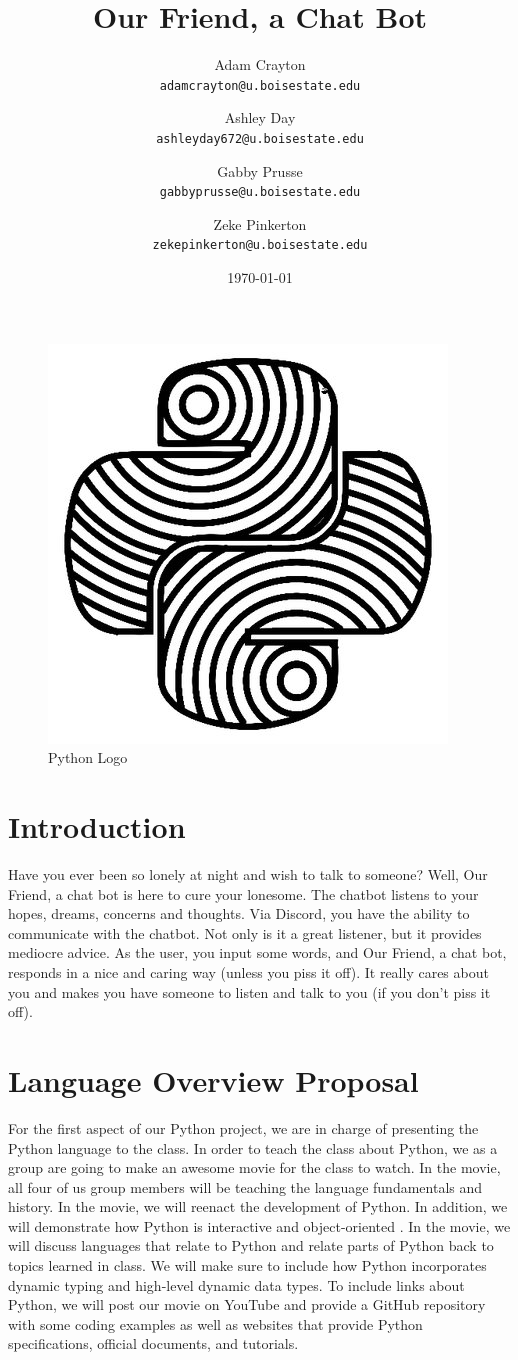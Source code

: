 \documentclass{article}
\title{Our Friend, a Chat Bot}
\author{
    Adam Crayton\\
    \texttt{adamcrayton@u.boisestate.edu}
    \and
    Ashley Day\\
    \texttt{ashleyday672@u.boisestate.edu}
    \and
    Gabby Prusse\\
    \texttt{gabbyprusse@u.boisestate.edu}
    \and
    Zeke Pinkerton\\
    \texttt{zekepinkerton@u.boisestate.edu}
}
\date{\today}
\begin{document}
\maketitle

\begin{figure}
\centering
\includegraphics[width=0.25\linewidth]{p3_latex/logo.jpg}
\caption{\label{fig:frog}Python Logo}
\end{figure}

\section{Introduction}
Have you ever been so lonely at night and wish to talk to someone? Well, Our Friend, a chat bot is here to cure your lonesome.
The chatbot listens to your hopes, dreams, concerns and thoughts.
Via Discord, you have the ability to communicate with the chatbot. Not only is it a great listener,
but it provides mediocre advice. As the user, you input some words, and Our Friend, a chat bot,
responds in a nice and caring way (unless you piss it off). It really cares about you and makes you
have someone to listen and talk to you (if you don't piss it off).

\section{Language Overview Proposal}
For the first aspect of our Python project, we are in charge of presenting the Python language to the
class. In order to teach the class about Python, we as a group are going to make an awesome movie for
the class to watch. In the movie, all four of us group members will be teaching the language fundamentals
and history. In the movie, we will reenact the development of Python. In addition, we will demonstrate
how Python is interactive and object-oriented \parencite[see][]{GeneralPython}. In the movie, we will discuss languages that relate to Python
and relate parts of Python back to topics learned in class. We will make sure to include how Python incorporates
dynamic typing and high-level dynamic data types. To include links about Python, we will post our movie on
YouTube and provide a GitHub repository with some coding examples as well as websites that provide Python
specifications, official documents, and tutorials.
\end{document}
